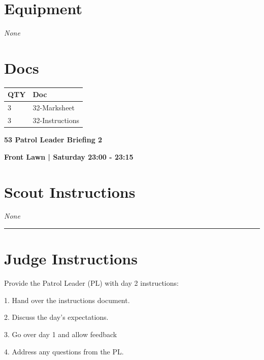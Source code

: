 \documentclass[10pt]{article}
\newcommand{\newtitle}[1]{\begin{center}{\Huge\bfseries #1 }\\ \vspace{5mm}\end{center}}
\newcommand{\newsubtitle}[1]{\begin{center}{\color{grey}\Large\bfseries #1 }\\ \vspace{5mm}\end{center}}
\begin{document}
	\begin{multicols}{2}

		\section*{\faWrench \: Equipment}

				\textit{None}
		
		\vfill\null
		\columnbreak

			\section*{\faFile \: Docs}
		 	\begin{center}
			\begin{tabular}{p{2cm}p{4cm}}

			\textbf{QTY} & \textbf{Doc} \\\toprule
										3&32-Marksheet\\\midrule
										3&32-Instructions\\\midrule
							\end{tabular}
			\end{center}
	

		\vfill\null

		\end{multicols}



	\vspace{1cm}


	\clearpage
		\newtitle{53 Patrol Leader Briefing 2 }
	\newsubtitle{Front Lawn | Saturday 23:00 - 23:15}
		\setcounter{section}{52}
	\section*{Scout Instructions}
		\textit{None}
	
	\vspace{0.5cm}
	\hrule
	\vspace{0.5cm}

		\section*{Judge Instructions}
		Provide the Patrol Leader (PL) with day 2 instructions:

1. Hand over the instructions document.

2. Discuss the day's expectations.

3. Go over day 1 and allow feedback

4. Address any questions from the PL.
\end{document}
